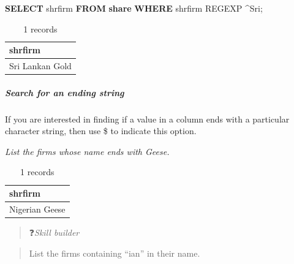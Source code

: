 \documentclass[
]{article}
\newenvironment{Shaded}{\begin{snugshade}}{\end{snugshade}}
\newcommand{\KeywordTok}[1]{\textcolor[rgb]{0.13,0.29,0.53}{\textbf{#1}}}
\newcommand{\NormalTok}[1]{#1}
\newcommand{\StringTok}[1]{\textcolor[rgb]{0.31,0.60,0.02}{#1}}
\begin{document}
\begin{Shaded}
\begin{Highlighting}[]
\KeywordTok{SELECT}\NormalTok{ shrfirm }\KeywordTok{FROM} \KeywordTok{share} \KeywordTok{WHERE}\NormalTok{ shrfirm REGEXP }\StringTok{\textquotesingle{}\^{}Sri\textquotesingle{}}\NormalTok{;}
\end{Highlighting}
\end{Shaded}

\begin{table}

\caption{\label{tab:unnamed-chunk-30}1 records}
\centering
\begin{tabular}[t]{l}
\hline
shrfirm\\
\hline
Sri Lankan Gold\\
\hline
\end{tabular}
\end{table}

\hypertarget{search-for-an-ending-string}{%
\subparagraph*{Search for an ending string}\label{search-for-an-ending-string}}

If you are interested in finding if a value in a column ends with a particular character string, then use \$ to indicate this option.

\emph{List the firms whose name ends with Geese.}

\begin{Shaded}
\end{Shaded}

\begin{table}

\caption{\label{tab:unnamed-chunk-31}1 records}
\centering
\begin{tabular}[t]{l}
\hline
shrfirm\\
\hline
Nigerian Geese\\
\hline
\end{tabular}
\end{table}

\begin{quote}
❓\emph{Skill builder}
\end{quote}

\begin{quote}
List the firms containing ``ian'' in their name.
\end{quote}
\end{document}
